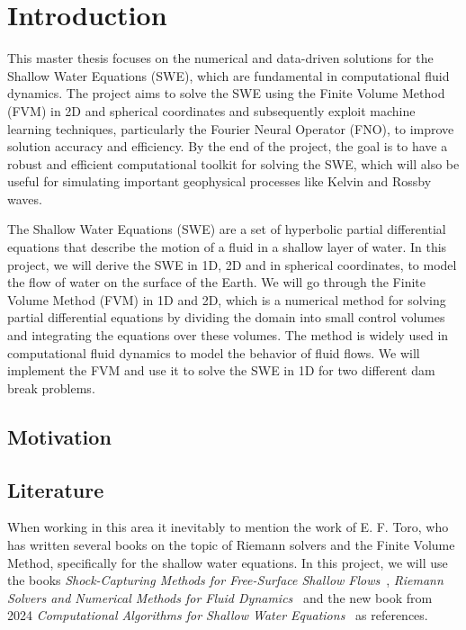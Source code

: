 \chapter{Introduction}

This master thesis focuses on the numerical and data-driven solutions for the Shallow Water Equations (SWE), which are fundamental in computational fluid dynamics.
The project aims to solve the SWE using the Finite Volume Method (FVM) in 2D and spherical coordinates and subsequently exploit machine learning techniques, particularly the Fourier Neural Operator (FNO), to improve solution accuracy and efficiency.
By the end of the project, the goal is to have a robust and efficient computational toolkit for solving the SWE, which will also be useful for simulating important geophysical processes like Kelvin and Rossby waves. 

The Shallow Water Equations (SWE) are a set of hyperbolic partial differential equations that describe the motion of a fluid in a shallow layer of water.
In this project, we will derive the SWE in 1D, 2D and in spherical coordinates, to model the flow of water on the surface of the Earth.
We will go through the Finite Volume Method (FVM) in 1D and 2D, which is a numerical method for solving partial differential equations by dividing the domain into small control volumes and integrating the equations over these volumes.
The method is widely used in computational fluid dynamics to model the behavior of fluid flows.
We will implement the FVM and use it to solve the SWE in 1D for two different dam break problems. 


\section{Motivation}

\section{Literature}
When working in this area it inevitably to mention the work of E. F. Toro, who has written several books on the topic of Riemann solvers and the Finite Volume Method, specifically for the shallow water equations.
In this project, we will use the books \textit{Shock-Capturing Methods for Free-Surface Shallow Flows}~\cite{Toro2001-Shock}, \textit{Riemann Solvers and Numerical Methods for Fluid Dynamics}~\cite{Toro2009-Riemann} and the new book from 2024 \textit{Computational Algorithms for Shallow Water Equations}~\cite{Toro2024} as references.

